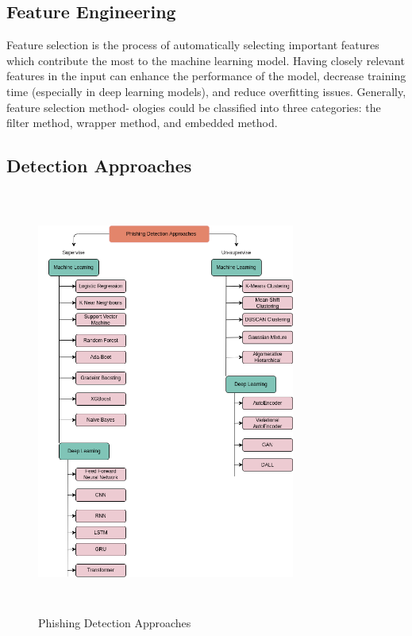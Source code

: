 \documentclass[final]{cvpr}
\begin{document}
\subsection{Feature Engineering}

Feature selection is the process of automatically selecting important features which
contribute the most to the machine learning model. Having closely relevant features in
the input can enhance the performance of the model, decrease training time (especially in
deep learning models), and reduce overfitting issues. Generally, feature selection method-
ologies could be classified into three categories: the filter method, wrapper method, and
embedded method.

\subsection{Detection Approaches}

\hspace*{-0.9in}
\begin{figure}[h]
   \centering
   \includegraphics[width=8.5cm, height=14cm]{phishing-detection-approaches.png}
   \caption{Phishing Detection Approaches}
\end{figure}
\end{document}
